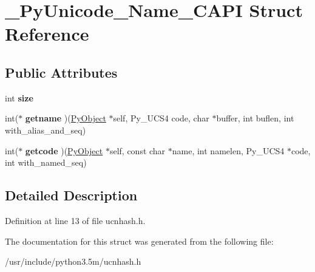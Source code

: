 \hypertarget{struct__PyUnicode__Name__CAPI}{}\section{\+\_\+\+Py\+Unicode\+\_\+\+Name\+\_\+\+C\+A\+PI Struct Reference}
\label{struct__PyUnicode__Name__CAPI}
\subsection*{Public Attributes}
\begin{DoxyCompactItemize}
\item 
int {\bfseries size}\hypertarget{struct__PyUnicode__Name__CAPI_a9faa2e068f88013c2c25a94a7df9c391}{}\label{struct__PyUnicode__Name__CAPI_a9faa2e068f88013c2c25a94a7df9c391}

\item 
int($\ast$ {\bfseries getname} )(\hyperlink{struct__object}{Py\+Object} $\ast$self, Py\+\_\+\+U\+C\+S4 code, char $\ast$buffer, int buflen, int with\+\_\+alias\+\_\+and\+\_\+seq)\hypertarget{struct__PyUnicode__Name__CAPI_af677a169ce7e7e94179c5ec5807c0ea7}{}\label{struct__PyUnicode__Name__CAPI_af677a169ce7e7e94179c5ec5807c0ea7}

\item 
int($\ast$ {\bfseries getcode} )(\hyperlink{struct__object}{Py\+Object} $\ast$self, const char $\ast$name, int namelen, Py\+\_\+\+U\+C\+S4 $\ast$code, int with\+\_\+named\+\_\+seq)\hypertarget{struct__PyUnicode__Name__CAPI_a9b058c6232cbc054356c68f1023f1984}{}\label{struct__PyUnicode__Name__CAPI_a9b058c6232cbc054356c68f1023f1984}

\end{DoxyCompactItemize}


\subsection{Detailed Description}


Definition at line 13 of file ucnhash.\+h.



The documentation for this struct was generated from the following file\+:\begin{DoxyCompactItemize}
\item 
/usr/include/python3.\+5m/ucnhash.\+h\end{DoxyCompactItemize}

